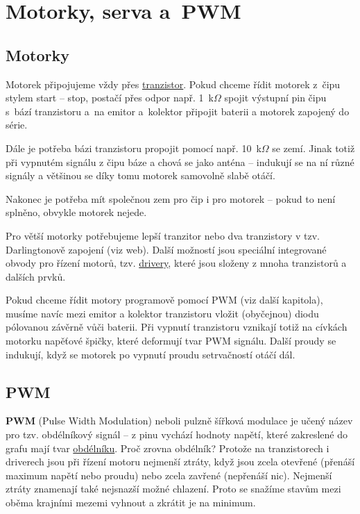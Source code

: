\section{Motorky, serva a~PWM}

\subsection{Motorky}

Motorek připojujeme vždy přes    \hyperlink{tranzistor}{tranzistor}. 
Pokud chceme řídit motorek z~čipu stylem start -- stop, postačí přes odpor 
např. 1~k$\Omega$ spojit výstupní pin čipu s~bází tranzistoru a~na emitor a~kolektor připojit baterii a motorek zapojený do série. 

Dále je potřeba bázi tranzistoru propojit pomocí např. 10~k$\Omega$ se zemí. 
Jinak totiž při vypnutém signálu z čipu báze  a chová se jako 
anténa -- indukují se na ní různé signály a většinou se díky tomu motorek samovolně slabě otáčí.   

Nakonec je potřeba mít společnou zem pro čip i pro motorek -- pokud to není splněno, obvykle motorek nejede. 

Pro větší motorky potřebujeme lepší tranzitor nebo dva tranzistory v tzv. Darlingtonově zapojení (viz web). 
Další možností jsou speciální integrované obvody pro řízení motorů, tzv.  
 \hyperref[driver]{drivery}, které jsou složeny z mnoha tranzistorů a dalších prvků. 

Pokud chceme řídit motory programově pomocí PWM (viz další kapitola), 
musíme navíc mezi emitor a kolektor tranzistoru vložit (obyčejnou) diodu pólovanou závěrně vůči baterii. 
Při vypnutí tranzistoru vznikají totiž na cívkách motorku napěťové špičky, které deformují tvar PWM signálu.  
Další proudy se indukují, když se motorek po vypnutí proudu setrvačností otáčí dál. 

\subsection{PWM} \label{PWM}   

{\bf PWM}  (Pulse Width Modulation) neboli pulzně šířková modulace je učený název pro tzv. obdélníkový signál -- z pinu vychází hodnoty napětí, které zakreslené do grafu mají tvar 
\href{https://www.arduino.cc/en/Tutorial/PWM}{obdélníku}.
 Proč zrovna obdélník? Protože na tranzistorech i driverech jsou při řízení motoru nejmenší ztráty, když jsou zcela otevřené (přenáší maximum napětí nebo proudu) nebo zcela zavřené (nepřenáší nic). Nejmenší ztráty znamenají také nejsnazší možné chlazení. Proto se snažíme stavům mezi oběma krajními mezemi vyhnout a zkrátit je na minimum. 


